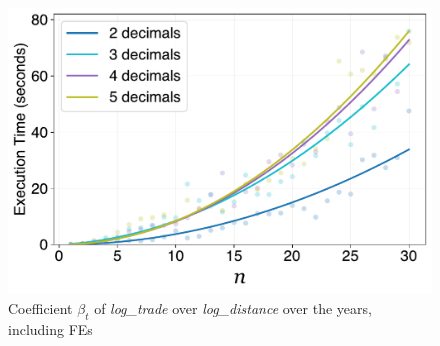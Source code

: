 \documentclass[../main.tex]{subfiles}
\begin{document}
\begin{figure}[H]
    \centering
    \includegraphics[width=0.6\linewidth]{decimals.pdf}
    \vspace{-0.25cm}
\caption{Coefficient $\beta_t$ of \textit{log\_trade} over \textit{log\_distance} over the years, including FEs}
\end{figure}
\end{document}
